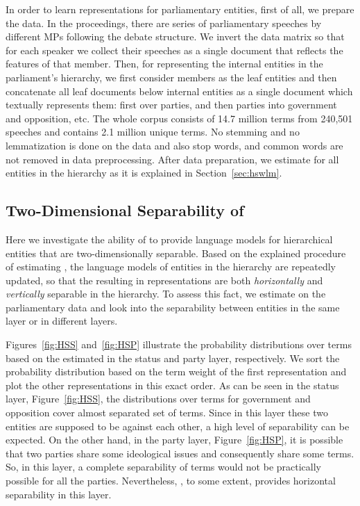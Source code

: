 In order to learn representations for parliamentary entities, first of all,  we prepare the data. In the proceedings, there are series of parliamentary speeches by different MPs following the debate structure.  We invert the data matrix so that for each speaker we collect their speeches as a single document that reflects the features of that member. Then, for representing the internal entities in the parliament's hierarchy, we first consider members as the leaf entities and then concatenate all leaf documents below internal entities as a single document which textually represents them: first over parties, and then parties into government and opposition, etc.
%
The whole corpus consists of 14.7 million terms from 240,501 speeches and contains 2.1 million unique terms. 
No stemming and no lemmatization is done on the data and also stop words, and common words are not removed in data preprocessing.  After data preparation, we estimate \acswlms for all entities in the hierarchy as it is explained in Section~\ref{sec:hswlm}.

\subsection{Two-Dimensional Separability of \achswlm}
\label{subsec:achswlmep}
Here we investigate the ability of \achswlm to provide language models for hierarchical entities that are two-dimensionally separable. 
Based on the explained procedure of estimating \achswlm, the language models of entities in the hierarchy are repeatedly updated, so that the resulting in representations are both \emph{horizontally} and \emph{vertically} separable in the hierarchy. To assess this fact, we estimate \achswlm on the parliamentary data and look into the separability between entities in the same layer or in different layers.

Figures~\ref{fig:HSS} and~\ref{fig:HSP} illustrate the probability distributions over terms based on the estimated \achswlms in the status and party layer, respectively. We sort the probability distribution based on the term weight of the first representation and plot the other representations in this exact order.
As can be seen in the status layer, Figure~\ref{fig:HSS}, the distributions over terms for government and opposition cover almost separated set of terms. Since in this layer these two entities are supposed to be against each other, a high level of separability can be expected. On the other hand, in the party layer, Figure~\ref{fig:HSP}, it is possible that two parties share some ideological issues and consequently share some terms. So, in this layer, a complete separability of terms would not be practically possible for all the parties. Nevertheless, \achswlm, to some extent, provides horizontal separability in this layer.


